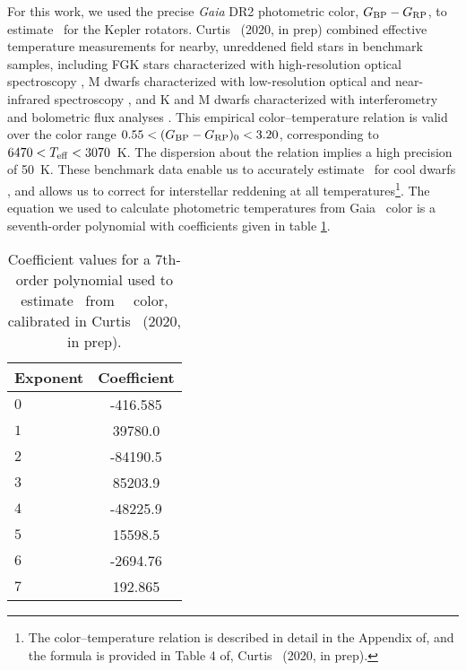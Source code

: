For this work, we used the precise \textit{Gaia} DR2 photometric color,
$G_{\rm BP} - G_{\rm RP}$, to estimate \teff\ for the Kepler rotators.
Curtis \etal\ (2020, in prep) combined effective temperature measurements for
nearby, unreddened field stars in benchmark samples, including FGK stars
characterized with high-resolution optical spectroscopy \citep{brewer2016}, M
dwarfs characterized with low-resolution optical and near-infrared
spectroscopy \citep{mann2015}, and K and M dwarfs characterized with
interferometry and bolometric flux analyses \citep{boyajian2012}.
This empirical color--temperature relation is valid over the color range $0.55
< (G_{\rm BP} - G_{\rm RP})_0 < 3.20$, corresponding to $6470 < T_{\rm eff} <
3070$~K.
The dispersion about the relation implies a high precision of 50~K.
These benchmark data enable us to accurately estimate \teff\ for cool dwarfs
\citep[\eg][]{rabus2019}, and allows us to correct for interstellar reddening
at all temperatures\footnote{The color--temperature relation is described in
detail in the Appendix of, and the formula is provided in Table 4 of, Curtis
\etal\ (2020, in prep).}.
The equation we used to calculate photometric temperatures from Gaia \gcolor\
color is a seventh-order polynomial with coefficients given in table
\ref{tab:coeffs}.
\begin{table}[h!]
  \begin{center}
      \caption{
          Coefficient values for a 7th-order polynomial used to estimate
      \teff\ from \Gaia\ \gcolor\ color, calibrated in Curtis \etal\ (2020, in
      prep).}
    \label{tab:coeffs}
    \begin{tabular}{l|c} %
      Exponent & Coefficient  \\
      \hline
      $0$ & -416.585 \\
      $1$ & 39780.0  \\
      $2$ & -84190.5 \\
      $3$ & 85203.9  \\
      $4$ & -48225.9 \\
      $5$ & 15598.5  \\
      $6$ & -2694.76 \\
      $7$ & 192.865  \\
    \end{tabular}
  \end{center}
\end{table}

